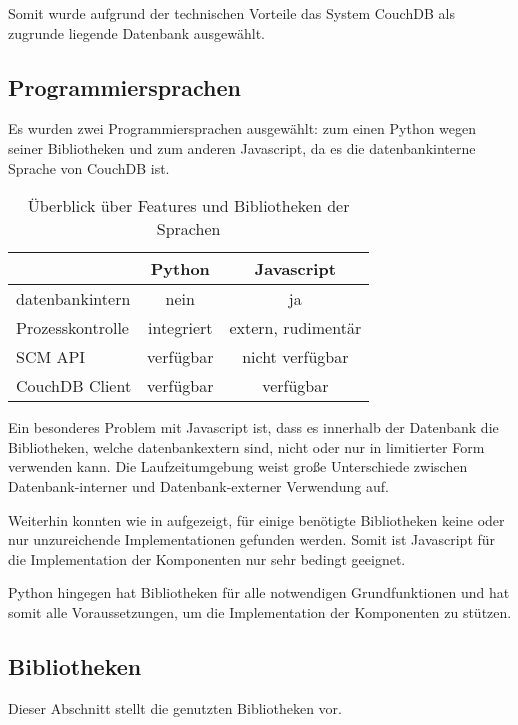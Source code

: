 Somit wurde aufgrund der technischen Vorteile das System CouchDB als zugrunde liegende Datenbank ausgewählt.

\subsection{Programmiersprachen}

Es wurden zwei Programmiersprachen ausgew\"ahlt:
zum einen Python wegen seiner Bibliotheken und
zum anderen Javascript, da es die datenbankinterne Sprache von CouchDB ist.

\begin{table}[ht]
\centering
\begin{tabular}{l|c|c}
                            & \textbf{Python} & \textbf{Javascript} \\
    \hline
    datenbankintern         & nein            & ja \\
    Prozesskontrolle        & integriert      & extern, rudimentär \\
    SCM API                & verfügbar       & nicht verfügbar \\
    CouchDB Client          & verfügbar       & verfügbar \\
\end{tabular}
\caption{Überblick über Features und Bibliotheken der Sprachen}
\label{tab:python-vs-js}
\end{table}

Ein besonderes Problem mit Javascript ist,
dass es innerhalb der Datenbank die Bibliotheken, welche datenbankextern sind,
nicht oder nur in limitierter Form verwenden kann.
Die Laufzeitumgebung weist große Unterschiede
zwischen Datenbank-interner und Datenbank-externer Verwendung auf.

Weiterhin konnten wie in  aufgezeigt,
für einige benötigte Bibliotheken keine
oder nur unzureichende Implementationen gefunden werden.
Somit ist Javascript für die Implementation der Komponenten
nur sehr bedingt geeignet.

Python hingegen hat Bibliotheken für alle notwendigen Grundfunktionen
und hat somit alle Voraussetzungen,
um die Implementation der Komponenten zu stützen.

\subsection{Bibliotheken}

Dieser Abschnitt stellt die genutzten Bibliotheken vor.

